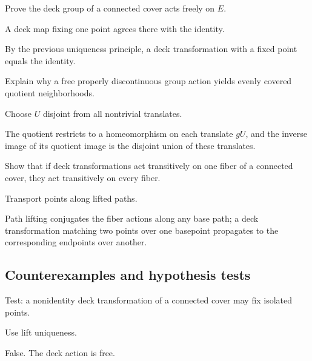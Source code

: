 \begin{exercise}\label{exr:viii12-ped-07}
Prove the deck group of a connected cover acts freely on $E$.
\end{exercise}
\begin{hint}
A deck map fixing one point agrees there with the identity.
\end{hint}
\begin{solution}
By the previous uniqueness principle, a deck transformation with a fixed point equals the identity.
\end{solution}

\begin{exercise}\label{exr:viii12-ped-08}
Explain why a free properly discontinuous group action yields evenly covered quotient neighborhoods.
\end{exercise}
\begin{hint}
Choose $U$ disjoint from all nontrivial translates.
\end{hint}
\begin{solution}
The quotient restricts to a homeomorphism on each translate $gU$, and the inverse image of its quotient image is the disjoint union of these translates.
\end{solution}

\begin{exercise}\label{exr:viii12-ped-09}
Show that if deck transformations act transitively on one fiber of a connected cover, they act transitively on every fiber.
\end{exercise}
\begin{hint}
Transport points along lifted paths.
\end{hint}
\begin{solution}
Path lifting conjugates the fiber actions along any base path; a deck transformation matching two points over one basepoint propagates to the corresponding endpoints over another.
\end{solution}

\subsection*{Counterexamples and hypothesis tests}

\begin{exercise}\label{exr:viii12-ped-10}
Test: a nonidentity deck transformation of a connected cover may fix isolated points.
\end{exercise}
\begin{hint}
Use lift uniqueness.
\end{hint}
\begin{solution}
False.  The deck action is free.
\end{solution}

